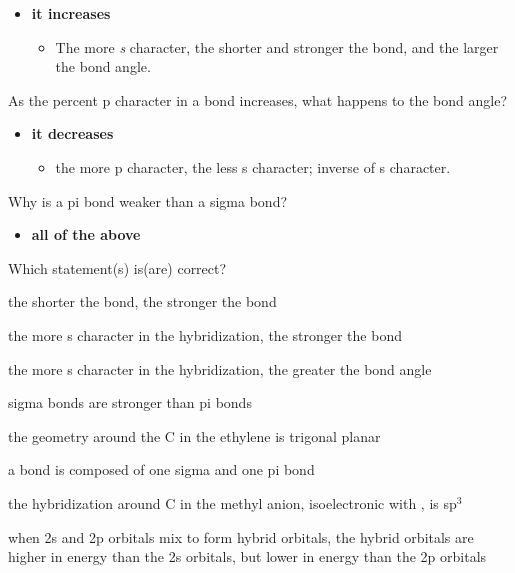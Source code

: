 \documentclass[12pt,a4paper]{article}
\begin{document}
\begin{enumerate}
\begin{itemize}
            \item {\color{o-Sun}\textbf{it increases}}
                \begin{itemize}
                    \item The more {\color{o-Sun}\textit{s} character}, the {\color{pos}shorter} and {\color{pos}stronger} the bond, and the {\color{pos}larger} the bond angle.
                \end{itemize}
        \end{itemize}
    {\color{G-Moon}\item As the percent p character in a bond increases, what happens to the bond angle?}
        \begin{itemize}
            \item {\color{o-Sun}\textbf{it decreases}}
                \begin{itemize}
                    \item the more p character, the less s character; inverse of s character.
                \end{itemize}
        \end{itemize}
    {\color{G-Moon}\item Why is a pi bond weaker than a sigma bond?}
        \begin{itemize}
            \item {\color{o-Sun}\textbf{all of the above}}
        \end{itemize}
    {\color{G-Moon}\item Which statement(s) is(are) correct?}
        \begin{itemize}
            {\color{G-Moon}\item the shorter the bond, the stronger the bond
            \item the more s character in the hybridization, the stronger the bond
            \item the more s character in the hybridization, the greater the bond angle
            \item sigma bonds are stronger than pi bonds
            \item the geometry around the C in the ethylene is trigonal planar
            \item a  bond is composed of one sigma and one pi bond
            \item the hybridization around C in the methyl anion, isoelectronic with , is sp\(^{3}\)
            \item when 2s and 2p orbitals mix to form hybrid orbitals, the hybrid orbitals are higher in energy than the 2s orbitals, but lower in energy than the 2p orbitals
}
\end{itemize}
\end{enumerate}
\end{document}

